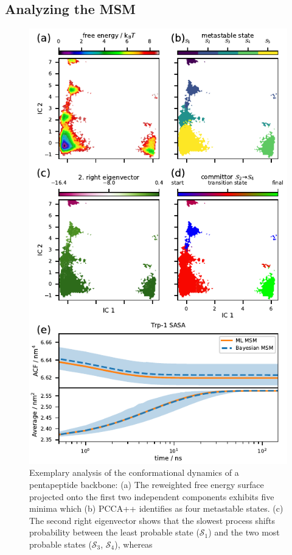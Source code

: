 \documentclass[9pt,tutorial]{livecoms}
\begin{document}
\subsection{Analyzing the MSM}

\begin{figure}
\includegraphics{figure_3}
\caption{Exemplary analysis of the conformational dynamics of a pentapeptide backbone:
(a) The reweighted free energy surface projected onto the first two independent components exhibits five minima which
(b) PCCA++ identifies as four metastable states.
(c) The second right eigenvector shows that the slowest process shifts probability between the least probable state ($\mathcal{S}_1$) and the two most probable states ($\mathcal{S}_3$, $\mathcal{S}_4$), whereas
}
\end{figure}
\end{document}
